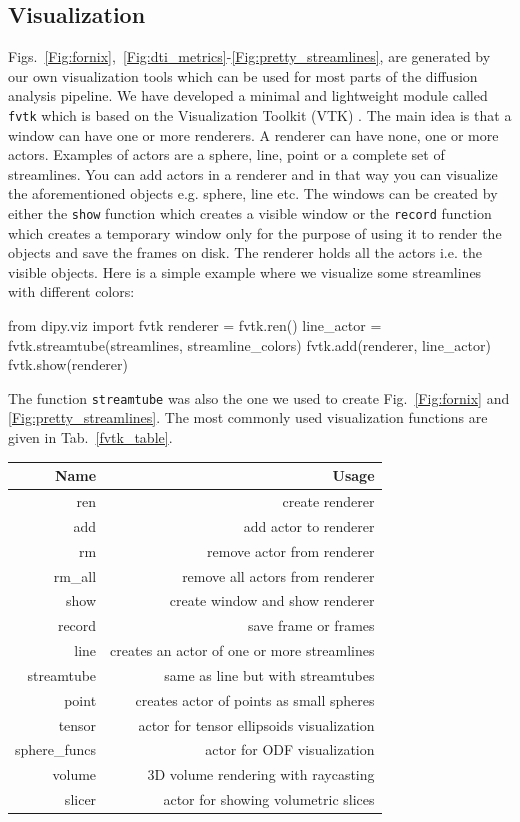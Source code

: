 \documentclass{bioinfo}
\begin{document}
\subsection{Visualization}
Figs.~\ref{Fig:fornix},~\ref{Fig:dti_metrics}-\ref{Fig:pretty_streamlines},
are generated by
our own visualization tools which can be used for most parts of the diffusion
analysis pipeline. We have developed a minimal and lightweight module called
\texttt{fvtk} which is based on the Visualization Toolkit (VTK)
\citep{schroeder:01}. The main idea is that a window can have one or more
renderers.
A renderer can have none, one or more actors. Examples of actors are a sphere,
line, point or a complete set of streamlines. You can add actors in a
renderer and in that way you can visualize the aforementioned objects e.g.
sphere, line etc. The windows can
be created by either the \texttt{show} function which creates a visible window
or the \texttt{record} function which creates a temporary window only for the
purpose of using it to render the objects and save the frames on disk. The
renderer holds all the actors i.e. the visible objects. Here is a simple example
where we visualize some streamlines with different colors:
\begin{python}
from dipy.viz import fvtk
renderer = fvtk.ren()
line_actor = fvtk.streamtube(streamlines,
                             streamline_colors)
fvtk.add(renderer, line_actor)
fvtk.show(renderer)
\end{python}
The function \texttt{streamtube} was also the one we used to create Fig.~\ref{Fig:fornix} and \ref{Fig:pretty_streamlines}.
The most commonly used visualization functions are given in Tab.~\ref{fvtk_table}.

\begin{table}[th] 
{\begin{tabular}{rr} \hline
Name & Usage \\ \hline
ren & create renderer\\
add & add actor to renderer\\
rm  & remove actor from renderer \\
rm\_all & remove all actors from renderer \\
show & create window and show renderer \\
record & save frame or frames \\
line & creates an actor of one or more streamlines \\
streamtube & same as line but with streamtubes \\
point & creates actor of points as small spheres \\
tensor & actor for tensor ellipsoids visualization\\
sphere\_funcs & actor for ODF visualization \\
volume & 3D volume rendering with raycasting \\
slicer & actor for showing volumetric slices \\
\hline
\end{tabular}}{}
\end{table}
\end{document}
